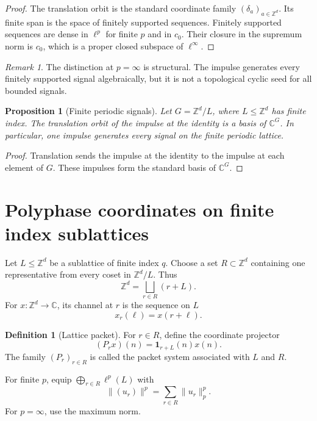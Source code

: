 \documentclass[11pt,a4paper]{article}
\newtheorem{proposition}[theorem]{Proposition}
\theoremstyle{definition}
\newtheorem{definition}[theorem]{Definition}
\theoremstyle{remark}
\newtheorem{remark}[theorem]{Remark}
\newcommand{\CC}{\mathbb C}
\newcommand{\ZZ}{\mathbb Z}
\newcommand{\one}{\mathbf 1}
\begin{document}
\begin{proof}
The translation orbit is the standard coordinate family \((\delta_a)_{a\in\ZZ^d}\). Its finite span is the space of finitely supported sequences. Finitely supported sequences are dense in \(\ell^p\) for finite \(p\) and in \(c_0\). Their closure in the supremum norm is \(c_0\), which is a proper closed subspace of \(\ell^\infty\).
\end{proof}

\begin{remark}\label{rem:infinity_boundary}
The distinction at \(p=\infty\) is structural. The impulse generates every finitely supported signal algebraically, but it is not a topological cyclic seed for all bounded signals.
\end{remark}

\begin{proposition}[Finite periodic signals]\label{prop:finite_periodic}
Let \(G=\ZZ^d/L\), where \(L\leq\ZZ^d\) has finite index. The translation orbit of the impulse at the identity is a basis of \(\CC^G\). In particular, one impulse generates every signal on the finite periodic lattice.
\end{proposition}

\begin{proof}
Translation sends the impulse at the identity to the impulse at each element of \(G\). These impulses form the standard basis of \(\CC^G\).
\end{proof}

\section{Polyphase coordinates on finite index sublattices}\label{extension:section:03}\label{sec:polyphase}

Let \(L\leq\ZZ^d\) be a sublattice of finite index \(q\). Choose a set \(R\subset\ZZ^d\) containing one representative from every coset in \(\ZZ^d/L\). Thus
\[
\ZZ^d=\bigsqcup_{r\in R}(r+L).
\]
For \(x:\ZZ^d\to\CC\), its channel at \(r\) is the sequence on \(L\)
\[
x_r(\ell)=x(r+\ell).
\]

\begin{definition}[Lattice packet]\label{def:lattice_packet}
For \(r\in R\), define the coordinate projector
\[
(P_rx)(n)=\one_{r+L}(n)x(n).
\]
The family \((P_r)_{r\in R}\) is called the packet system associated with \(L\) and \(R\).
\end{definition}

For finite \(p\), equip \(\bigoplus_{r\in R}\ell^p(L)\) with
\[
\|(u_r)\|^p=\sum_{r\in R}\|u_r\|_p^p.
\]
For \(p=\infty\), use the maximum norm.
\end{document}
